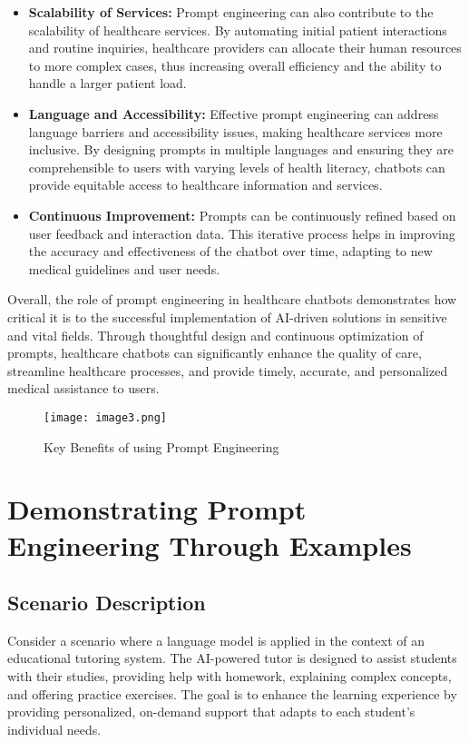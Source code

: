 \begin{itemize}
    \item \textbf{Scalability of Services:} Prompt engineering can also contribute to the scalability of healthcare services. By automating initial patient interactions and routine inquiries, healthcare providers can allocate their human resources to more complex cases, thus increasing overall efficiency and the ability to handle a larger patient load.

    \item \textbf{Language and Accessibility:} Effective prompt engineering can address language barriers and accessibility issues, making healthcare services more inclusive. By designing prompts in multiple languages and ensuring they are comprehensible to users with varying levels of health literacy, chatbots can provide equitable access to healthcare information and services.

    \item \textbf{Continuous Improvement:} Prompts can be continuously refined based on user feedback and interaction data. This iterative process helps in improving the accuracy and effectiveness of the chatbot over time, adapting to new medical guidelines and user needs.

\end{itemize}

Overall, the role of prompt engineering in healthcare chatbots demonstrates how critical it is to the successful implementation of AI-driven solutions in sensitive and vital fields. Through thoughtful design and continuous optimization of prompts, healthcare chatbots can significantly enhance the quality of care, streamline healthcare processes, and provide timely, accurate, and personalized medical assistance to users.

\begin{figure}
    \centering
    \texttt{[image: image3.png]}
    \caption{Key Benefits of using Prompt Engineering}
    \label{fig:key-benefits}
\end{figure}

\chapter{Demonstrating Prompt Engineering Through Examples}
\section{Scenario Description}
Consider a scenario where a language model is applied in the context of an educational tutoring system. The AI-powered tutor is designed to assist students with their studies, providing help with homework, explaining complex concepts, and offering practice exercises. The goal is to enhance the learning experience by providing personalized, on-demand support that adapts to each student's individual needs.

